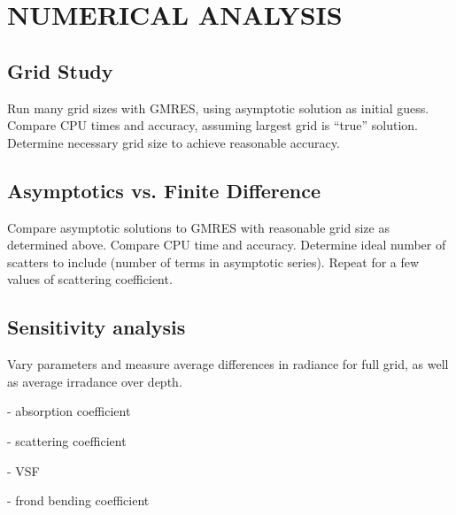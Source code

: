 \chapter{NUMERICAL ANALYSIS} \label{ch:model_analysis}

\section{Grid Study}
Run many grid sizes with GMRES, using asymptotic solution as initial guess.
Compare CPU times and accuracy, assuming largest grid is ``true'' solution.
Determine necessary grid size to achieve reasonable accuracy.

\section{Asymptotics vs. Finite Difference}
Compare asymptotic solutions to GMRES with reasonable grid size as determined
above. Compare CPU time and accuracy. Determine ideal number of scatters to
include (number of terms in asymptotic series). Repeat for a few values of
scattering coefficient.

\section{Sensitivity analysis}
Vary parameters and measure average differences in radiance for full grid, as
well as average irradance over depth.

- absorption coefficient

- scattering coefficient

- VSF

- frond bending coefficient
